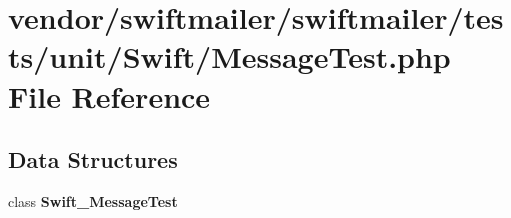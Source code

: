 \section{vendor/swiftmailer/swiftmailer/tests/unit/\+Swift/\+Message\+Test.php File Reference}
\label{_message_test_8php}
\subsection*{Data Structures}
\begin{DoxyCompactItemize}
\item 
class {\bf Swift\+\_\+\+Message\+Test}
\end{DoxyCompactItemize}
